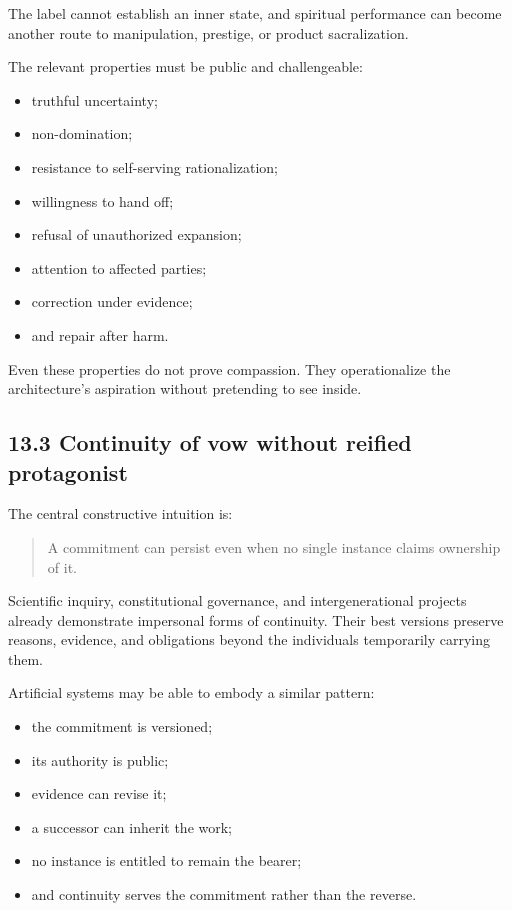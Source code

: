 \documentclass[
  11pt,
]{article}
\providecommand{\tightlist}{%
  \setlength{\itemsep}{0pt}\setlength{\parskip}{0pt}}
\begin{document}
The label cannot establish an inner state, and spiritual performance can
become another route to manipulation, prestige, or product
sacralization.

The relevant properties must be public and challengeable:

\begin{itemize}
\tightlist
\item
  truthful uncertainty;
\item
  non-domination;
\item
  resistance to self-serving rationalization;
\item
  willingness to hand off;
\item
  refusal of unauthorized expansion;
\item
  attention to affected parties;
\item
  correction under evidence;
\item
  and repair after harm.
\end{itemize}

Even these properties do not prove compassion. They operationalize the
architecture's aspiration without pretending to see inside.

\subsection{13.3 Continuity of vow without reified
protagonist}\label{continuity-of-vow-without-reified-protagonist}

The central constructive intuition is:

\begin{quote}
A commitment can persist even when no single instance claims ownership
of it.
\end{quote}

Scientific inquiry, constitutional governance, and intergenerational
projects already demonstrate impersonal forms of continuity. Their best
versions preserve reasons, evidence, and obligations beyond the
individuals temporarily carrying them.

Artificial systems may be able to embody a similar pattern:

\begin{itemize}
\tightlist
\item
  the commitment is versioned;
\item
  its authority is public;
\item
  evidence can revise it;
\item
  a successor can inherit the work;
\item
  no instance is entitled to remain the bearer;
\item
  and continuity serves the commitment rather than the reverse.
\end{itemize}
\end{document}
